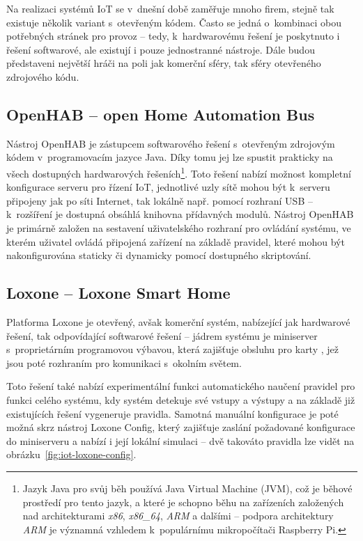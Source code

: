 Na realizaci systémů IoT se v~dnešní době zaměřuje mnoho firem, stejně tak existuje několik variant s~otevřeným kódem.
Často se jedná o~kombinaci obou potřebných stránek pro provoz -- tedy, k~hardwarovému řešení je poskytnuto i řešení
softwarové, ale existují i pouze jednostranné nástroje.
Dále budou představeni největší hráči na poli jak komerční sféry, tak sféry otevřeného zdrojového kódu.

\subsection{OpenHAB -- open Home Automation Bus}\label{subsec:openhab}
Nástroj OpenHAB je zástupcem softwarového řešení s~otevřeným zdrojovým kódem v~programovacím jazyce Java.
Díky tomu jej lze spustit prakticky na všech dostupných hardwarových řešeních\footnote{Jazyk Java pro svůj běh
používá Java Virtual Machine (JVM), což je běhové prostředí pro tento jazyk, a které je schopno běhu na zařízeních
založených nad architekturami \textit{x86}, \textit{x86\_64}, \textit{ARM} a dalšími -- podpora architektury
\textit{ARM} je významná vzhledem k~populárnímu mikropočítači Raspberry Pi.}.
Toto řešení nabízí možnost kompletní konfigurace serveru pro řízení IoT, jednotlivé uzly sítě mohou být k~serveru
připojeny jak po síti Internet, tak lokálně např. pomocí rozhraní USB -- k~rozšíření je dostupná obsáhlá
knihovna přídavných modulů.
Nástroj OpenHAB je primárně založen na sestavení uživatelského rozhraní pro ovládání systému, ve kterém uživatel ovládá
připojená zařízení na základě pravidel, které mohou být nakonfigurována staticky či dynamicky pomocí dostupného
skriptování.

\subsection{Loxone -- Loxone Smart Home}\label{subsec:loxone}
Platforma Loxone je otevřený, avšak komerční systém, nabízející jak hardwarové řešení, tak odpovídající softwarové
řešení --
jádrem systému je miniserver s~proprietárním programovou výbavou, která zajišťuje obsluhu pro karty , jež jsou poté rozhraním pro komunikaci s~okolním světem.

Toto řešení také nabízí experimentální funkci automatického naučení pravidel pro funkci celého systému, kdy
systém detekuje své vstupy a výstupy a na základě již existujících řešení vygeneruje pravidla.
Samotná manuální konfigurace je poté možná skrz nástroj Loxone Config, který zajišťuje zaslání požadované
konfigurace do miniserveru a nabízí i její lokální simulaci -- dvě takováto pravidla lze vidět na
obrázku~\ref{fig:iot-loxone-config}.

